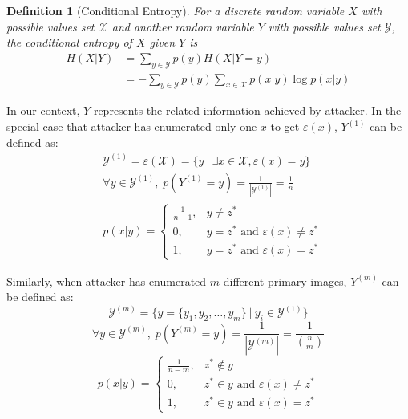 \documentclass[10pt, conference, compsocconf]{IEEEtran}
\newtheorem{mydef}{Definition}
\begin{document}
        \begin{mydef}[Conditional Entropy\cite{math_book, info_measure}]\label{def_con_entropy}
            For a discrete random variable $X$ with
            possible values set $\mathcal X$ and another random
            variable $Y$ with possible values
            set $\mathcal{Y}$, the conditional entropy
            of $X$ given $Y$ is
            \begin{align}
                H(X|Y) &= \sum_{y \in \mathcal Y} p(y) H(X | Y = y)\\
                    &= -\sum_{y \in \mathcal Y} p(y) \sum_{x \in \mathcal X} p(x|y) \log p(x|y)
            \end{align}
        \end{mydef}

        In our context, $Y$ represents the related information
        achieved by attacker. In the special case that attacker has enumerated only one
        $x$ to get $\varepsilon(x)$, $Y^{(1)}$ can be defined as:
        \begin{align*}
            &\mathcal Y^{(1)} = \varepsilon(\mathcal X) = \{y \: | \: \exists x \in \mathcal X, \varepsilon(x) = y\}\\
            &\forall y \in \mathcal Y^{(1)}, \; p(Y^{(1)} = y) = \frac{1}{|\mathcal Y^{(1)}|} = \frac{1}{n}\\
            &p(x|y) = \begin{cases}
                \frac{1}{n-1}, &y \neq z^*\\
                0, &y = z^* \text{ and } \varepsilon(x) \neq z^*\\
                1, &y = z^* \text{ and } \varepsilon(x) = z^*
            \end{cases}
        \end{align*}

        Similarly, when attacker has enumerated $m$ different primary images, $Y^{(m)}$ can be defined
        as:
        \begin{equation*}
            \mathcal Y^{(m)} = \{ y = \{y_1, y_2, \ldots, y_m\} \: | \: y_i \in \mathcal Y^{(1)}\}
        \end{equation*}
        \begin{equation*}
            \forall y \in \mathcal Y^{(m)}, \; p(Y^{(m)} = y) = \frac{1}{|\mathcal Y^{(m)}|} = \frac{1}{\binom{n}{m}}
        \end{equation*}
        \begin{equation*}
            p(x|y) = \begin{cases}
                \frac{1}{n-m}, &z^* \notin y\\
                0, &z^* \in y \text{ and } \varepsilon(x) \neq z^*\\
                1, &z^* \in y \text{ and } \varepsilon(x) = z^*
            \end{cases}
        \end{equation*}
\end{document}

